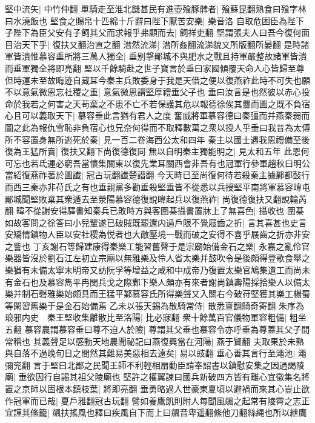 堅中流矢|{
	中竹仲翻}
單騎走至淮北饑甚民有進壺飱豚髀者|{
	飱蘇昆翻熟食曰飱字林曰水澆飯也}
堅食之賜帛十匹綿十斤辭曰陛下厭苦安樂|{
	樂音洛}
自取危困臣為陛下子陛下為臣父安有子飼其父而求報乎弗顧而去|{
	飼祥吏翻}
堅謂張夫人曰吾今復何面目治天下乎|{
	復扶又翻治直之翻}
澘然流涕|{
	澘所姦翻流涕貌又所版翻所晏翻}
是時諸軍皆潰惟慕容垂所將三萬人獨全|{
	垂别撃鄖城不與肥水之戰且持軍嚴整故諸軍皆潰而垂軍獨全將即亮翻}
堅以千餘騎赴之世子寶言於垂曰家國傾覆天命人心皆歸至尊但時運未至故晦迹自藏耳今秦主兵敗委身于我是天借之便以復燕祚此時不可失也願不以意氣微恩忘社稷之重|{
	意氣微恩謂堅厚禮垂父子也}
垂曰汝言是也然彼以赤心投命於我若之何害之天苟棄之不患不亡不若保護其危以報德徐俟其釁而圖之既不負宿心且可以義取天下|{
	慕容垂此言猶有君人之度}
奮威將軍慕容德曰秦彊而并燕秦弱而圖之此為報仇雪恥非負宿心也兄奈何得而不取釋數萬之衆以授人乎垂曰我昔為太傅所不容置身無所逃死於秦|{
	見一百二卷海西公太和四年}
秦主以國士遇我恩禮備至後復為王猛所賣|{
	復扶又翻下尚復德復同}
無以自明秦主獨能明之|{
	見太和五年}
此恩何可忘也若氐運必窮吾當懷集關東以復先業耳關西會非吾有也冠軍行參軍趙秋曰明公當紹復燕祚著於圖䜟|{
	冠古玩翻䜟楚譛翻}
今天時已至尚復何待若殺秦主據鄴都鼔行而西三秦亦非苻氏之有也垂親黨多勸垂殺堅垂皆不從悉以兵授堅平南將軍慕容暐屯鄖城聞堅敗棄其衆遁去至滎陽慕容德復說暐起兵以復燕祚|{
	尚復德復扶又翻說輸芮翻}
暐不從謝安得驛書知秦兵已敗時方與客圍棊攝書置牀上了無喜色|{
	攝收也}
圍棊如故客問之徐答曰小兒輩遂已破賊既罷還内過戶限不覺屐齒之折|{
	言其喜甚也史言安矯情鎮物人臣以安社稷為悦者也大敵壓境一戰而破之安得不喜乎屐齒之折亦非安之訾也}
丁亥謝石等歸建康得秦樂工能習舊聲于是宗廟始備金石之樂|{
	永嘉之亂伶官樂器皆沒於劉石江左初立宗廟以無雅樂及伶人省太樂并鼓吹令是後頗得登歌食舉之樂猶有未備太寧末明帝又訪阮孚等增益之咸和中成帝乃復置太樂官鳩集遺工而尚未有金石也及慕容雋平冉閔兵戈之際鄴下樂人頗亦有來者謝尚鎮夀陽採拾樂人以備太樂并制石磬雅樂始頗具而王猛平鄴慕容氏所得樂聲又入關右今破苻堅獲其樂工楊蜀等閑習舊樂于是金石始備焉}
乙未以張天錫為散騎常侍|{
	散悉亶翻騎奇寄翻}
朱序為琅邪内史　秦王堅收集離散比至洛陽|{
	比必寐翻}
衆十餘萬百官儀物軍容粗備|{
	粗坐五翻}
慕容農謂慕容垂曰尊不迫人於險|{
	尊謂其父垂也慕容令亦呼垂為尊蓋其父子間常稱也}
其義聲足以感動天地農聞祕記曰燕復興當在河陽|{
	燕于賢翻}
夫取果於未熟與自落不過晚旬日之間然其難易美惡相去遠矣|{
	易以豉翻}
垂心善其言行至澠池|{
	澠彌兖翻}
言于堅曰北鄙之民聞王師不利輕相扇動臣請奉詔書以鎮慰安集之因過謁陵廟|{
	垂欲因行自謁其祖父陵廟也}
堅許之權翼諫曰國兵新破四方皆有離心宜徵集名將置之京師以固根本鎮枝葉|{
	將即亮翻}
垂勇略過人世豪東夏頃以避禍而來其心豈止欲作冠軍而已哉|{
	夏戶雅翻冠古玩翻}
譬如養鷹飢則附人每聞風飊之起常有陵霄之志正宜謹其絛籠|{
	飊扶搖風也釋曰疾風自下而上曰飊音卑遥翻絛他刀翻絲䋲也所以紲鷹}
